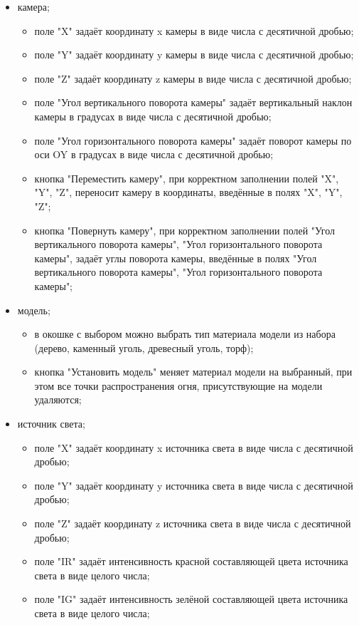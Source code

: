 \documentclass[a4paper,14pt]{report}
\begin{document}
\begin{itemize}
\item камера;
\begin{itemize}
\item поле "X" задаёт координату x камеры в виде числа с десятичной дробью;
\item поле "Y" задаёт координату y камеры в виде числа с десятичной дробью;
\item поле "Z" задаёт координату z камеры в виде числа с десятичной дробью;
\item поле "Угол вертикального поворота камеры" задаёт вертикальный наклон камеры в градусах в виде числа с десятичной дробью;
\item поле "Угол горизонтального поворота камеры" задаёт поворот камеры по оси OY в градусах в виде числа с десятичной дробью;
\item кнопка "Переместить камеру", при корректном заполнении полей "X", "Y", "Z", переносит камеру в координаты, введённые в полях "X", "Y", "Z";
\item кнопка "Повернуть камеру", при корректном заполнении полей "Угол вертикального поворота камеры", "Угол горизонтального поворота камеры", задаёт углы поворота камеры, введённые в полях "Угол вертикального поворота камеры", "Угол горизонтального поворота камеры";
\end{itemize}
\item модель;
\begin{itemize}
\item в окошке с выбором можно выбрать тип материала модели из набора (дерево, каменный уголь, древесный уголь, торф);
\item кнопка "Установить модель" меняет материал модели на выбранный, при этом все точки распространения огня, присутствующие на модели удаляются;
\end{itemize}
\item источник света;
\begin{itemize}
\item поле "X" задаёт координату x источника света в виде числа с десятичной дробью;
\item поле "Y" задаёт координату y источника света в виде числа с десятичной дробью;
\item поле "Z" задаёт координату z источника света в виде числа с десятичной дробью;
\item поле "IR" задаёт интенсивность красной составляющей цвета источника света в виде целого числа;
\item поле "IG" задаёт интенсивность зелёной составляющей цвета источника света в виде целого числа;

\end{itemize}
\end{itemize}
\end{document}

